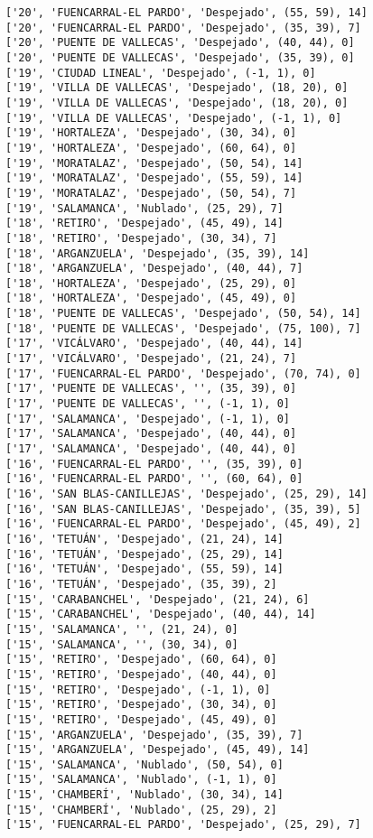 \documentclass[11pt]{article}
\begin{document}
\begin{Verbatim}[commandchars=\\\{\}]
['20', 'FUENCARRAL-EL PARDO', 'Despejado', (55, 59), 14]
['20', 'FUENCARRAL-EL PARDO', 'Despejado', (35, 39), 7]
['20', 'PUENTE DE VALLECAS', 'Despejado', (40, 44), 0]
['20', 'PUENTE DE VALLECAS', 'Despejado', (35, 39), 0]
['19', 'CIUDAD LINEAL', 'Despejado', (-1, 1), 0]
['19', 'VILLA DE VALLECAS', 'Despejado', (18, 20), 0]
['19', 'VILLA DE VALLECAS', 'Despejado', (18, 20), 0]
['19', 'VILLA DE VALLECAS', 'Despejado', (-1, 1), 0]
['19', 'HORTALEZA', 'Despejado', (30, 34), 0]
['19', 'HORTALEZA', 'Despejado', (60, 64), 0]
['19', 'MORATALAZ', 'Despejado', (50, 54), 14]
['19', 'MORATALAZ', 'Despejado', (55, 59), 14]
['19', 'MORATALAZ', 'Despejado', (50, 54), 7]
['19', 'SALAMANCA', 'Nublado', (25, 29), 7]
['18', 'RETIRO', 'Despejado', (45, 49), 14]
['18', 'RETIRO', 'Despejado', (30, 34), 7]
['18', 'ARGANZUELA', 'Despejado', (35, 39), 14]
['18', 'ARGANZUELA', 'Despejado', (40, 44), 7]
['18', 'HORTALEZA', 'Despejado', (25, 29), 0]
['18', 'HORTALEZA', 'Despejado', (45, 49), 0]
['18', 'PUENTE DE VALLECAS', 'Despejado', (50, 54), 14]
['18', 'PUENTE DE VALLECAS', 'Despejado', (75, 100), 7]
['17', 'VICÁLVARO', 'Despejado', (40, 44), 14]
['17', 'VICÁLVARO', 'Despejado', (21, 24), 7]
['17', 'FUENCARRAL-EL PARDO', 'Despejado', (70, 74), 0]
['17', 'PUENTE DE VALLECAS', '', (35, 39), 0]
['17', 'PUENTE DE VALLECAS', '', (-1, 1), 0]
['17', 'SALAMANCA', 'Despejado', (-1, 1), 0]
['17', 'SALAMANCA', 'Despejado', (40, 44), 0]
['17', 'SALAMANCA', 'Despejado', (40, 44), 0]
['16', 'FUENCARRAL-EL PARDO', '', (35, 39), 0]
['16', 'FUENCARRAL-EL PARDO', '', (60, 64), 0]
['16', 'SAN BLAS-CANILLEJAS', 'Despejado', (25, 29), 14]
['16', 'SAN BLAS-CANILLEJAS', 'Despejado', (35, 39), 5]
['16', 'FUENCARRAL-EL PARDO', 'Despejado', (45, 49), 2]
['16', 'TETUÁN', 'Despejado', (21, 24), 14]
['16', 'TETUÁN', 'Despejado', (25, 29), 14]
['16', 'TETUÁN', 'Despejado', (55, 59), 14]
['16', 'TETUÁN', 'Despejado', (35, 39), 2]
['15', 'CARABANCHEL', 'Despejado', (21, 24), 6]
['15', 'CARABANCHEL', 'Despejado', (40, 44), 14]
['15', 'SALAMANCA', '', (21, 24), 0]
['15', 'SALAMANCA', '', (30, 34), 0]
['15', 'RETIRO', 'Despejado', (60, 64), 0]
['15', 'RETIRO', 'Despejado', (40, 44), 0]
['15', 'RETIRO', 'Despejado', (-1, 1), 0]
['15', 'RETIRO', 'Despejado', (30, 34), 0]
['15', 'RETIRO', 'Despejado', (45, 49), 0]
['15', 'ARGANZUELA', 'Despejado', (35, 39), 7]
['15', 'ARGANZUELA', 'Despejado', (45, 49), 14]
['15', 'SALAMANCA', 'Nublado', (50, 54), 0]
['15', 'SALAMANCA', 'Nublado', (-1, 1), 0]
['15', 'CHAMBERÍ', 'Nublado', (30, 34), 14]
['15', 'CHAMBERÍ', 'Nublado', (25, 29), 2]
['15', 'FUENCARRAL-EL PARDO', 'Despejado', (25, 29), 7]

\end{Verbatim}
\end{document}
